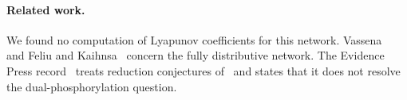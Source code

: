 \documentclass[11pt,a4paper]{report}
\begin{document}
\paragraph{Related work.} We found no computation of Lyapunov coefficients for this network. Vassena~\autocite{Vassena2026} and Feliu and Kaihnsa~\autocite{FK2024} concern the fully distributive network. The Evidence Press record~\autocite{Zenodo23446981} treats reduction conjectures of~\autocite{FK2024} and states that it does not resolve the dual-phosphorylation question.

\paperreferences
\end{document}

